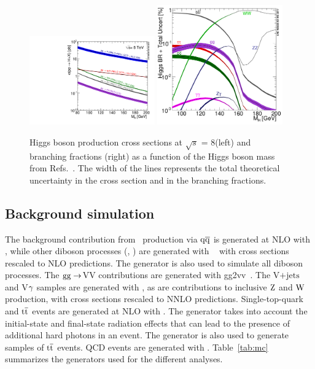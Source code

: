\documentclass[11pt,twoside,a4paper,cmspaper,final,collab]{cms-tdr}
\begin{document}
\begin{figure}[tbp]
  \begin{center}
    \includegraphics[width=0.48\textwidth]{figures/Higgs_XS_8TeV_LM200.pdf}
    \includegraphics[width=0.48\textwidth]{figures/BR_lm_quadrato.pdf}
    \caption{Higgs boson production cross sections  at $\sqrt{s}$ = 8\TeV (left) and branching fractions (right) as a function of the Higgs
boson mass from Refs.~\cite{LHCHiggsCrossSectionWorkingGroup:2011ti,Dittmaier:2012vm}. The width of the lines
represents the total theoretical uncertainty in the cross section and in the branching fractions.}
    \label{fig:xs_and_br_lm}
  \end{center}
\end{figure}

\subsection{Background simulation}

The background contribution from \cPZ\cPZ\ production via $\mathrm{q}\mathrm{\overline{q}}$ is generated at NLO with {\POWHEG}, while
other diboson processes (\PW\PW, \PW\cPZ) are generated with {\MADGRAPH}~\cite{Alwall:2011uj,Alwall:2007st}
with cross sections rescaled to NLO predictions. The {\PYTHIA} generator is also used to simulate all diboson processes.
The $\mathrm{g}\mathrm{g} \rightarrow$VV
contributions are generated with {\sc gg2vv}~\cite{Binoth:2008pr}.
The  V$+\text{jets}$  and V$\gamma$ samples
are generated with {\MADGRAPH}, as are contributions to inclusive $\mathrm{Z}$ and  $\mathrm{W}$ production,
with cross sections rescaled to NNLO predictions.
Single-top-quark and $\mathrm{t}\overline{\mathrm{t}}$ events are generated at NLO with {\POWHEG}.
 The {\PYTHIA} generator takes into account the  initial-state and final-state radiation effects that
can lead to the presence of additional hard photons in an event.
The {\MADGRAPH} generator is also used to generate samples of $\mathrm{t}\overline{\mathrm{t}}$ events.
QCD events are generated with {\PYTHIA}.
Table~\ref{tab:mc} summarizes the generators used for the different analyses.
\end{document}
